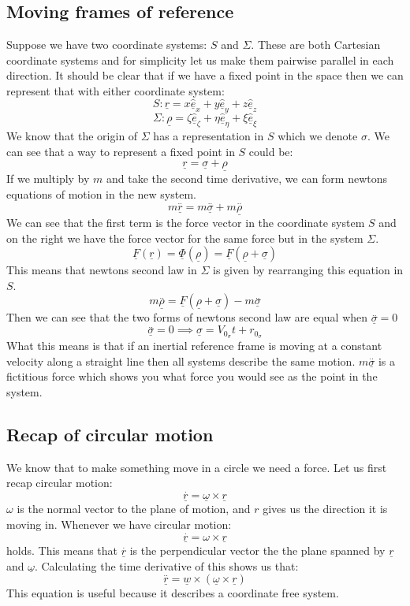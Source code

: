 \documentclass[12pt]{article}
\newcommand{\uvec}[1]{\underline{\hat{#1}}}
\newcommand{\bvec}[1]{\uvec{e}_#1}
\begin{document}
\subsection*{Moving frames of reference}
Suppose we have two coordinate systems: \(S\) and \(\Sigma\). These are both Cartesian coordinate systems and for simplicity let us make them pairwise parallel in each direction. It should be clear that if we have a fixed point in the space then we can represent that with either coordinate system:
\[S: \underline{r}=x\bvec{x}+y\bvec{y}+z\bvec{z}\]
\[\Sigma:\underline{\rho}=\zeta\bvec{\zeta}+\eta\bvec{\eta}+\xi\bvec{\xi}\]
We know that the origin of \(\Sigma\) has a representation in \(S\) which we denote \(\sigma\). We can see that a way to represent a fixed point in \(S\) could be:
\[\underline{r}=\underline{\sigma}+\underline{\rho}\]
If we multiply by \(m\) and take the second time derivative, we can form newtons equations of motion in the new system.
\[m\overset{..}{\underline{r}}=m\overset{..}{\underline{\sigma}}+m\overset{..}{\underline{\rho}}\]
We can see that the first term is the force vector in the coordinate system \(S\) and on the right we have the force vector for the same force but in the system \(\Sigma\).
\[\underline{F}(\underline{r})=\underline{\Phi}(\underline{\rho})=\underline{F}(\underline{\rho}+\underline{\sigma})\]
This means that newtons second law in \(\Sigma\) is given by rearranging this equation in \(S\).
\[m\overset{..}{\underline{\rho}}=\underline{F}(\underline{\rho}+\underline{\sigma})-m\overset{..}{\underline{\sigma}}\]
Then we can see that the two forms of newtons second law are equal when \(\overset{..}{\underline{\sigma}}=0\)
\[\overset{..}{\underline{\sigma}}=0\implies\underline{\sigma}=V_{0_\sigma}t+r_{0_\sigma}\]
What this means is that if an inertial reference frame is moving at a constant velocity along a straight line then all systems describe the same motion. \(m\overset{..}{\underline{\sigma}}\) is a fictitious force which shows you what force you would see as the point in the system.
\subsection*{Recap of circular motion}
We know that to make something move in a circle we need a force. Let us first recap circular motion:
\[\underline{\overset{.}{r}}=\underline{\omega}\times\underline{r}\]
\(\omega\) is the normal vector to the plane of motion, and \(r\) gives us the direction it is moving in. Whenever we have circular motion:
\[\overset{.}{\underline{r}}=\omega\times\underline{r}\]
holds. This means that \(\overset{.}{\underline{r}}\) is the perpendicular vector the the plane spanned by \(\underline{r}\) and \(\underline{\omega}\). Calculating the time derivative of this shows us that:
\[\underline{\overset{..}{r}}=\underline{w}\times(\underline{\omega}\times\underline{r})\]
This equation is useful because it describes a coordinate free system.
\end{document}
